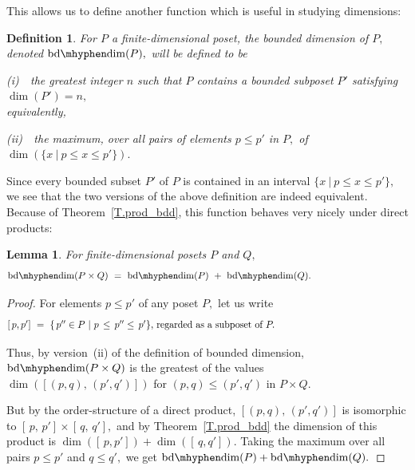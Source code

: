 \documentclass{amsart}
\newtheorem{lemma}[theorem]{Lemma}
\newtheorem{definition}[theorem]{Definition}
\numberwithin{equation}{section}
\numberwithin{theorem}{section}
\renewcommand{\r}{\mathrm}
\newcommand{\2}{\mathbf{2}}
\begin{document}
This allows us to define
another function which is useful in studying dimensions:

\begin{definition}\label{D.bd-dim}
For $P$ a finite-dimensional poset, the
{\em bounded dimension} of $P,$
denoted $\r{bd\mhyphen dim}(P),$ will be defined to be

\textup{(i)}~~the greatest integer $n$ such that $P$ contains a
bounded subposet $P'$ satisfying $\dim(P')=n,$\\
%
equivalently,

\textup{(ii)}~~the maximum, over all pairs of elements $p\leq p'$
in $P,$ of $\dim(\{x~|~p\leq x\leq p'\}).$
\end{definition}

Since every bounded subset $P'$ of $P$ is contained in an
interval $\{x~|~p\leq x\leq p'\},$ we see that
the two versions of the above definition are indeed equivalent.
Because of Theorem~\ref{T.prod_bdd},
this function behaves very nicely under direct products:

\begin{lemma}\label{L.bd-dim}
For finite-dimensional posets $P$ and $Q,$
%
\begin{equation}\begin{minipage}[c]{35pc}\label{d.bd-dim}
$\r{bd\mhyphen dim}(P\times Q)\ =\ %
\r{bd\mhyphen dim}(P)\ +\ \r{bd\mhyphen dim}(Q).$
\end{minipage}\end{equation}
%
\end{lemma}

\begin{proof}
For elements $p\leq p'$ of any poset $P,$ let us write
%
\begin{equation}\begin{minipage}[c]{35pc}\label{d.[p,p']}
$[\,p,p']\ =\ \{\,p''\in P~|~p\,\leq\,p''\leq\,p'\},$ regarded as
a subposet of $P.$
\end{minipage}\end{equation}

Thus, by version~(ii) of the definition of bounded dimension,
$\r{bd\mhyphen dim}(P\times Q)$ is the greatest of the
values $\dim([(p,q),\,(p',q')])$ for $(p,q)\leq (p',q')$
in $P\times Q.$

But by the order-structure of a direct product,
$[(p,q),\,(p',q')]$ is isomorphic to $[\,p,\,p']\times [\,q,\,q'],$
and by Theorem~\ref{T.prod_bdd} the dimension of this
product is $\dim([\,p,p'])+\dim([\,q,q']).$
Taking the maximum over all pairs $p\leq p'$ and $q\leq q',$
we get $\r{bd\mhyphen dim}(P)+\r{bd\mhyphen dim}(Q).$
\end{proof}
\end{document}
